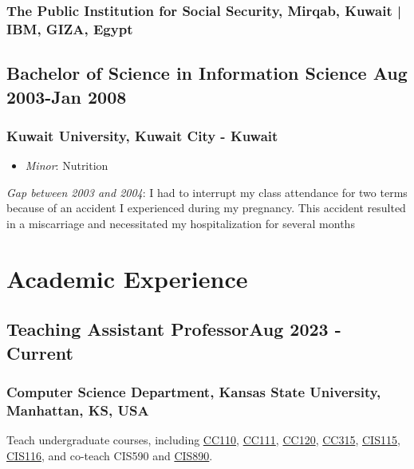 \documentclass[11pt]{article}
\begin{document}
\subsubsection{The Public Institution for Social Security,  Mirqab, Kuwait |  IBM, GIZA, Egypt}
\vspace{0.8em} %

\subsection{Bachelor of Science in Information Science  \hfill \normalfont Aug 2003-Jan 2008}  
\subsubsection{Kuwait University, Kuwait City - Kuwait}
\begin{itemize}
    \item \textit{Minor}: Nutrition
    \end{itemize}
       \noindent\textit{Gap between 2003 and 2004}: I had to interrupt my class attendance for two terms because of an accident I experienced during my pregnancy. This accident resulted in a miscarriage and necessitated my hospitalization for several months

\section{Academic Experience}
\vspace{0.8em} %
\subsection{Teaching Assistant Professor\hfill \normalfont Aug 2023 - Current}  
\subsubsection{Computer Science Department, Kansas State University,  Manhattan, KS, USA}
    \noindent Teach undergraduate courses, including \hyperref[sec:CC110]{CC110}, \hyperref[sec:CC111]{CC111}, \hyperref[sec:CC120]{CC120}, \hyperref[sec:CC315]{CC315}, \hyperref[sec:CIS115]{CIS115}, \hyperref[sec:CIS116]{CIS116}, and co-teach CIS590 and \hyperref[sec: CIS890]{CIS890}. 
\vspace{0.8em} %
\end{document}
